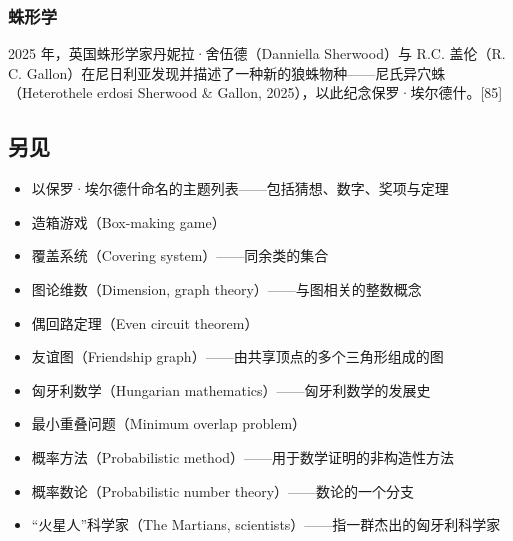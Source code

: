 \subsubsection{蛛形学}
2025 年，英国蛛形学家丹妮拉·舍伍德（Danniella Sherwood）与 R.C. 盖伦（R. C. Gallon）在尼日利亚发现并描述了一种新的狼蛛物种——尼氏异穴蛛（Heterothele erdosi Sherwood & Gallon, 2025），以此纪念保罗·埃尔德什。[85]
\subsection{另见}
\begin{itemize}
\item 以保罗·埃尔德什命名的主题列表——包括猜想、数字、奖项与定理
\item 造箱游戏（Box-making game）
\item 覆盖系统（Covering system）——同余类的集合
\item 图论维数（Dimension, graph theory）——与图相关的整数概念
\item 偶回路定理（Even circuit theorem）
\item 友谊图（Friendship graph）——由共享顶点的多个三角形组成的图
\item 匈牙利数学（Hungarian mathematics）——匈牙利数学的发展史
\item 最小重叠问题（Minimum overlap problem）
\item 概率方法（Probabilistic method）——用于数学证明的非构造性方法
\item 概率数论（Probabilistic number theory）——数论的一个分支
\item “火星人”科学家（The Martians, scientists）——指一群杰出的匈牙利科学家
\end{itemize}
